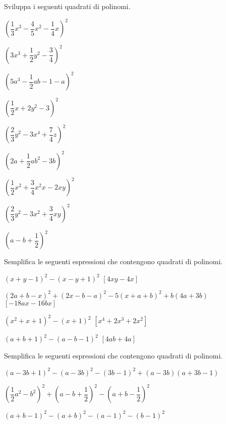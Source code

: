 \begin{esercizio}
 \label{ese:11.13}
Sviluppa i seguenti quadrati di polinomi.

\begin{multicols}{3}
\begin{enumeratea}
\spazielenx
\item $\left(\dfrac{1}{3}x^{3}-\dfrac{4}{5}x^{2}-\dfrac{1}{4}x\right)^{2}$
\item $\left(3x^{3}+\dfrac{1}{2}y^{2}-\dfrac{3}{4}\right)^{2}$
\item $\left(5a^{3}-\dfrac{1}{2}{ab}-1-a\right)^{2}$
\item $\left(\dfrac{1}{2}x+2y^{2}-3\right)^{2}$
\item $\left(\dfrac{2}{3}y^{2}-3x^{4}+\dfrac{7}{4}z\right)^{2}$
\item $\left(2a+\dfrac{1}{2}{ab}^{2}-3b\right)^{2}$
\item $\left(\dfrac{1}{2}x^{2}+\dfrac{3}{4}x^{2}x-2{xy}\right)^{2}$
\item $\left(\dfrac{2}{3}y^{2}-3x^{2}+\dfrac{3}{4}{xy}\right)^{2}$
\item $\left(a-b+\dfrac{1}{2}\right)^{2}$
\end{enumeratea}
\end{multicols}
\end{esercizio}

\begin{esercizio}[\Ast]
 \label{ese:11.14}
Semplifica le seguenti espressioni che contengono quadrati di polinomi.

\begin{enumeratea}
 \item $(x+y-1)^{2}-(x-y+1)^{2}$
  \hfill $\left[4{xy}-4x\right]$
\item $(2a+b-x)^{2}+(2x-b-a)^{2}-5(x+a+b)^{2}+b(4a+3b)$
  \hfill $\left[-18ax-16bx\right]$
\item $\left(x^{2}+x+1\right)^{2}-(x+1)^{2}$
  \hfill $\left[x^{4}+2x^{3}+2x^{2}\right]$
\item $(a+b+1)^{2}-(a-b-1)^{2}$
  \hfill $\left[4ab+4a\right]$
\end{enumeratea}
\end{esercizio}

\begin{esercizio}
 \label{ese:11.15}
Semplifica le seguenti espressioni che contengono quadrati di polinomi.

\begin{enumeratea}
 \item $(a-3b+1)^{2}-(a-3b)^{2}-(3b-1)^{2}+(a-3b)(a+3b-1)$
\item 
$\left(\dfrac{1}{2}a^{2}-b^{2}\right)^{2}+\left(a-b+\dfrac{1}{2}\right)^{2}
-\left(a+b-\dfrac{1}{2}\right)^{2}$
\item $(a+b-1)^{2}-(a+b)^{2}-(a-1)^{2}-(b-1)^{2}$
\end{enumeratea}
\end{esercizio}

